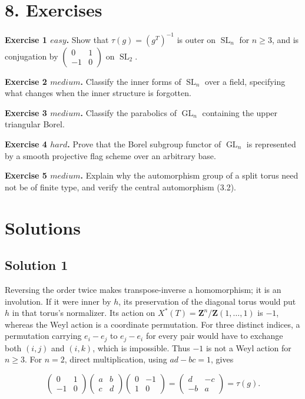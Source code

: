 \documentclass[11pt,a4paper,openany]{report}
\begin{document}
\section{8. Exercises}\label{AG-RG-06-exercises}

\textbf{Exercise 1 \(easy\).} Show that \(\tau(g)=(g^T)^{-1}\) is outer on \(\operatorname{SL}_n\) for \(n\geq3\), and is conjugation by \(\left(\begin{smallmatrix}0&1\\-1&0\end{smallmatrix}\right)\) on \(\operatorname{SL}_2\).

\textbf{Exercise 2 \(medium\).} Classify the inner forms of \(\operatorname{SL}_n\) over a field, specifying what changes when the inner structure is forgotten.

\textbf{Exercise 3 \(medium\).} Classify the parabolics of \(\operatorname{GL}_n\) containing the upper triangular Borel.

\textbf{Exercise 4 \(hard\).} Prove that the Borel subgroup functor of \(\operatorname{GL}_n\) is represented by a smooth projective flag scheme over an arbitrary base.

\textbf{Exercise 5 \(medium\).} Explain why the automorphism group of a split torus need not be of finite type, and verify the central automorphism (3.2).

\section{Solutions}\label{AG-RG-06-solutions}

\subsection{Solution 1}\label{AG-RG-06-solution-1}

Reversing the order twice makes transpose-inverse a homomorphism; it is an involution. If it were inner by \(h\), its preservation of the diagonal torus would put \(h\) in that torus's normalizer. Its action on \(X^*(T)=\mathbf Z^n/\mathbf Z(1,\ldots,1)\) is \(-1\), whereas the Weyl action is a coordinate permutation. For three distinct indices, a permutation carrying \(e_i-e_j\) to \(e_j-e_i\) for every pair would have to exchange both \((i,j)\) and \((i,k)\), which is impossible. Thus \(-1\) is not a Weyl action for \(n\geq3\). For \(n=2\), direct multiplication, using \(ad-bc=1\), gives

\[
\begin{pmatrix}0&1\\-1&0\end{pmatrix}
\begin{pmatrix}a&b\\c&d\end{pmatrix}
\begin{pmatrix}0&-1\\1&0\end{pmatrix}
=\begin{pmatrix}d&-c\\-b&a\end{pmatrix}
=\tau(g).
\]
\end{document}
